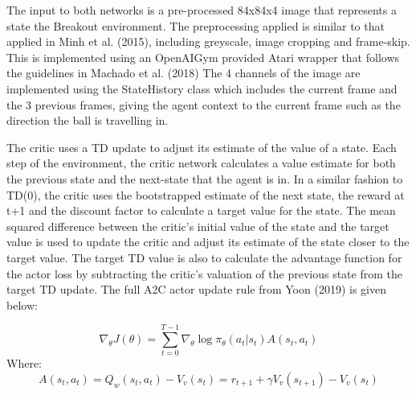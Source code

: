 \documentclass{article}
\begin{document}
The input to both networks is a pre-processed 84x84x4 image that represents a state the Breakout environment. The preprocessing applied is similar to that applied in Minh et al. (2015), including greyscale, image cropping and frame-skip. This is implemented using an OpenAIGym provided Atari wrapper that follows the guidelines in Machado et al. (2018) The 4 channels of the image are implemented using the StateHistory class which includes the current frame and the 3 previous frames, giving the agent context to the current frame such as the direction the ball is travelling in.

The critic uses a TD update to adjust its estimate of the value of a state. Each step of the environment, the critic network calculates a value estimate for both the previous state and the next-state that the agent is in. In a similar fashion to TD(0), the critic uses the bootstrapped estimate of the next state, the reward at t+1 and the discount factor to calculate a target value for the state. The mean squared difference between the critic's initial value of the state and the target value is used to update the critic and adjust its estimate of the state closer to the target value. The target TD value is also to calculate the advantage function for the actor loss by subtracting the critic's valuation of the previous state from the target TD update. The full A2C actor update rule from Yoon (2019) is given below: 

\begin{equation}
\nabla_{\theta} J(\theta) = \sum_{t=0}^{T-1}\nabla_{\theta}\log{\pi_{\theta}}(a_{t} | s_{t}) A(s_{t}, a_{t})
\end{equation}
Where:
\begin{equation}
A(s_{t}, a_{t}) = Q_{w}(s_{t}, a_{t}) - V_{v}(s_{t}) = r_{t+1} + \gamma V_{v}(s_{t+1}) - V_{v}(s_{t})
\end{equation}
\end{document}
